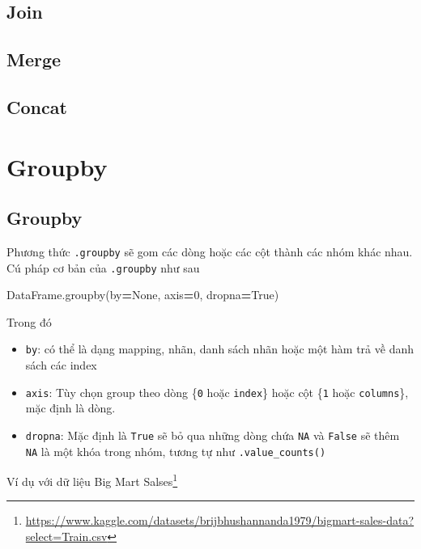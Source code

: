 \documentclass[
]{book}
\newenvironment{Shaded}{\begin{snugshade}}{\end{snugshade}}
\newcommand{\DecValTok}[1]{\textcolor[rgb]{0.00,0.00,0.81}{#1}}
\newcommand{\NormalTok}[1]{#1}
\newcommand{\OperatorTok}[1]{\textcolor[rgb]{0.81,0.36,0.00}{\textbf{#1}}}
\newcommand{\VariableTok}[1]{\textcolor[rgb]{0.00,0.00,0.00}{#1}}
\renewcommand{\href}[2]{#2\footnote{\url{#1}}}
\begin{document}
\section{Join}\label{join}

\section{Merge}\label{merge}

\section{Concat}\label{concat}

\chapter{Groupby}\label{groupby}

\section{Groupby}\label{groupby-1}

Phương thức \texttt{.groupby} sẽ gom các dòng hoặc các cột thành các nhóm khác nhau. Cú pháp cơ bản của \texttt{.groupby} như sau

\begin{Shaded}
\begin{Highlighting}[]
\NormalTok{DataFrame.groupby(by}\OperatorTok{=}\VariableTok{None}\NormalTok{, axis}\OperatorTok{=}\DecValTok{0}\NormalTok{, dropna}\OperatorTok{=}\VariableTok{True}\NormalTok{)}
\end{Highlighting}
\end{Shaded}

Trong đó

\begin{itemize}
\item
  \texttt{by}: có thể là dạng mapping, nhãn, danh sách nhãn hoặc một hàm trả về danh sách các index
\item
  \texttt{axis}: Tùy chọn group theo dòng \{\texttt{0} hoặc \texttt{index}\} hoặc cột \{\texttt{1} hoặc \texttt{columns}\}, mặc định là dòng.
\item
  \texttt{dropna}: Mặc định là \texttt{True} sẽ bỏ qua những dòng chứa \texttt{NA} và \texttt{False} sẽ thêm \texttt{NA} là một khóa trong nhóm, tương tự như \texttt{.value\_counts()}
\end{itemize}

Ví dụ với dữ liệu \href{https://www.kaggle.com/datasets/brijbhushannanda1979/bigmart-sales-data?select=Train.csv}{Big Mart Salses}
\end{document}
